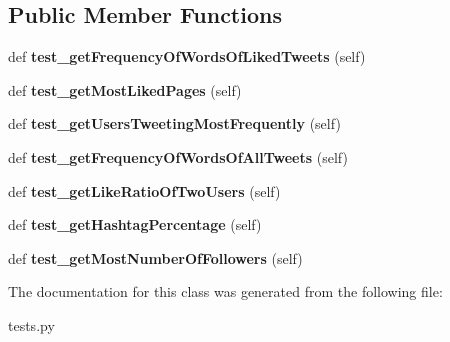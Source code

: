 \subsection*{Public Member Functions}
\begin{DoxyCompactItemize}
\item 
\mbox{\label{classtwitter_1_1tests_1_1_stats_test_cases_ae7e663218f193abe62a2ec355bcd976e}} 
def {\bfseries test\+\_\+get\+Frequency\+Of\+Words\+Of\+Liked\+Tweets} (self)
\item 
\mbox{\label{classtwitter_1_1tests_1_1_stats_test_cases_a78a25891e8faaa226a38a43539ecb5a9}} 
def {\bfseries test\+\_\+get\+Most\+Liked\+Pages} (self)
\item 
\mbox{\label{classtwitter_1_1tests_1_1_stats_test_cases_ab61ba217f8dfe8a84e7d33de828bdaf2}} 
def {\bfseries test\+\_\+get\+Users\+Tweeting\+Most\+Frequently} (self)
\item 
\mbox{\label{classtwitter_1_1tests_1_1_stats_test_cases_a3581f04cb8a74b0559e63ed8caccce4d}} 
def {\bfseries test\+\_\+get\+Frequency\+Of\+Words\+Of\+All\+Tweets} (self)
\item 
\mbox{\label{classtwitter_1_1tests_1_1_stats_test_cases_a2379f24f8f9c91e49709bc01e8d32637}} 
def {\bfseries test\+\_\+get\+Like\+Ratio\+Of\+Two\+Users} (self)
\item 
\mbox{\label{classtwitter_1_1tests_1_1_stats_test_cases_ae2af08fbd0d5c8d92b1e8f5d0a183ede}} 
def {\bfseries test\+\_\+get\+Hashtag\+Percentage} (self)
\item 
\mbox{\label{classtwitter_1_1tests_1_1_stats_test_cases_af724a16f2c313472fb69dc39e727c23b}} 
def {\bfseries test\+\_\+get\+Most\+Number\+Of\+Followers} (self)
\end{DoxyCompactItemize}


The documentation for this class was generated from the following file\+:\begin{DoxyCompactItemize}
\item 
tests.\+py\end{DoxyCompactItemize}
